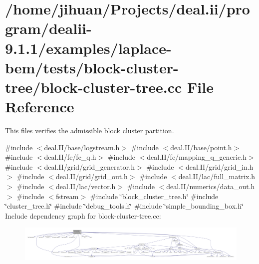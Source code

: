 \hypertarget{block-cluster-tree_8cc}{}\section{/home/jihuan/\+Projects/deal.ii/program/dealii-\/9.1.1/examples/laplace-\/bem/tests/block-\/cluster-\/tree/block-\/cluster-\/tree.cc File Reference}
\label{block-cluster-tree_8cc}


This files verifies the admissible block cluster partition.  


{\ttfamily \#include $<$deal.\+I\+I/base/logstream.\+h$>$}\newline
{\ttfamily \#include $<$deal.\+I\+I/base/point.\+h$>$}\newline
{\ttfamily \#include $<$deal.\+I\+I/fe/fe\+\_\+q.\+h$>$}\newline
{\ttfamily \#include $<$deal.\+I\+I/fe/mapping\+\_\+q\+\_\+generic.\+h$>$}\newline
{\ttfamily \#include $<$deal.\+I\+I/grid/grid\+\_\+generator.\+h$>$}\newline
{\ttfamily \#include $<$deal.\+I\+I/grid/grid\+\_\+in.\+h$>$}\newline
{\ttfamily \#include $<$deal.\+I\+I/grid/grid\+\_\+out.\+h$>$}\newline
{\ttfamily \#include $<$deal.\+I\+I/lac/full\+\_\+matrix.\+h$>$}\newline
{\ttfamily \#include $<$deal.\+I\+I/lac/vector.\+h$>$}\newline
{\ttfamily \#include $<$deal.\+I\+I/numerics/data\+\_\+out.\+h$>$}\newline
{\ttfamily \#include $<$fstream$>$}\newline
{\ttfamily \#include \char`\"{}block\+\_\+cluster\+\_\+tree.\+h\char`\"{}}\newline
{\ttfamily \#include \char`\"{}cluster\+\_\+tree.\+h\char`\"{}}\newline
{\ttfamily \#include \char`\"{}debug\+\_\+tools.\+h\char`\"{}}\newline
{\ttfamily \#include \char`\"{}simple\+\_\+bounding\+\_\+box.\+h\char`\"{}}\newline
Include dependency graph for block-\/cluster-\/tree.cc\+:\nopagebreak
\begin{figure}[H]
\begin{center}
\leavevmode
\includegraphics[width=350pt]{block-cluster-tree_8cc__incl}
\end{center}
\end{figure}
